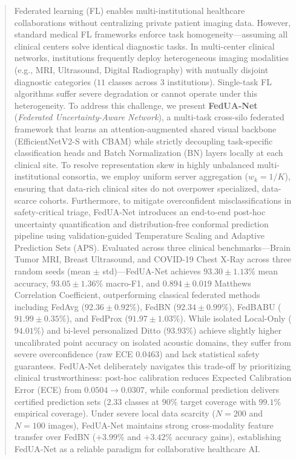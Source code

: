 \documentclass[journal]{IEEEtran}
\begin{document}
\begin{abstract}
Federated learning (FL) enables multi-institutional healthcare collaborations without centralizing private patient imaging data. However, standard medical FL frameworks enforce task homogeneity---assuming all clinical centers solve identical diagnostic tasks. In multi-center clinical networks, institutions frequently deploy heterogeneous imaging modalities (e.g., MRI, Ultrasound, Digital Radiography) with mutually disjoint diagnostic categories ($11$ classes across $3$ institutions). Single-task FL algorithms suffer severe degradation or cannot operate under this heterogeneity. 
To address this challenge, we present \textbf{FedUA-Net} (\textit{Federated Uncertainty-Aware Network}), a multi-task cross-silo federated framework that learns an attention-augmented shared visual backbone (EfficientNetV2-S with CBAM) while strictly decoupling task-specific classification heads and Batch Normalization (BN) layers locally at each clinical site. To resolve representation skew in highly unbalanced multi-institutional consortia, we employ uniform server aggregation ($w_k = 1/K$), ensuring that data-rich clinical sites do not overpower specialized, data-scarce cohorts. Furthermore, to mitigate overconfident misclassifications in safety-critical triage, FedUA-Net introduces an end-to-end post-hoc uncertainty quantification and distribution-free conformal prediction pipeline using validation-guided Temperature Scaling and Adaptive Prediction Sets (APS).
Evaluated across three clinical benchmarks---Brain Tumor MRI, Breast Ultrasound, and COVID-19 Chest X-Ray across three random seeds (mean $\pm$ std)---FedUA-Net achieves $93.30 \pm 1.13\%$ mean accuracy, $93.05 \pm 1.36\%$ macro-F1, and $0.894 \pm 0.019$ Matthews Correlation Coefficient, outperforming classical federated methods including FedAvg ($92.36 \pm 0.92\%$), FedBN ($92.34 \pm 0.99\%$), FedBABU ($91.99 \pm 0.35\%$), and FedProx ($91.97 \pm 1.03\%$). While isolated Local-Only ($94.01\%$) and bi-level personalized Ditto ($93.93\%$) achieve slightly higher uncalibrated point accuracy on isolated acoustic domains, they suffer from severe overconfidence (raw ECE $0.0463$) and lack statistical safety guarantees. FedUA-Net deliberately navigates this trade-off by prioritizing clinical trustworthiness: post-hoc calibration reduces Expected Calibration Error (ECE) from $0.0504 \to 0.0307$, while conformal prediction delivers certified prediction sets ($2.33$ classes at $90\%$ target coverage with $99.1\%$ empirical coverage). Under severe local data scarcity ($N=200$ and $N=100$ images), FedUA-Net maintains strong cross-modality feature transfer over FedBN ($+3.99\%$ and $+3.42\%$ accuracy gains), establishing FedUA-Net as a reliable paradigm for collaborative healthcare AI.
\end{abstract}
\end{document}
